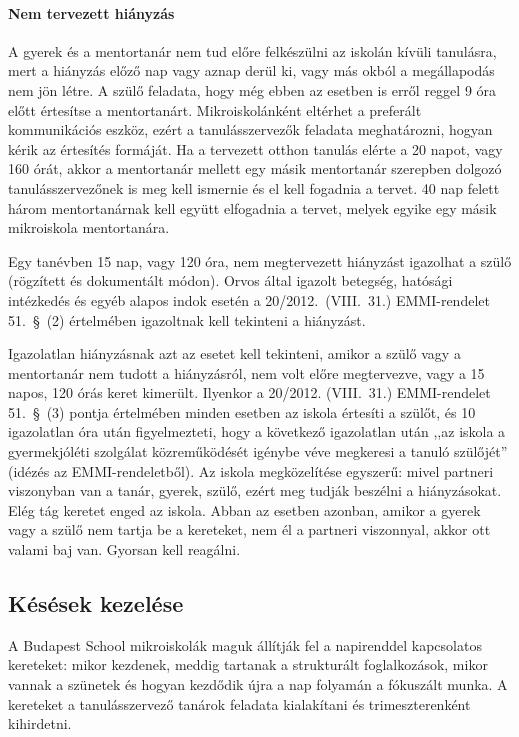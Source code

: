 \paragraph{Nem tervezett hiányzás} A gyerek és a mentortanár nem tud előre felkészülni az iskolán kívüli tanulásra, mert a hiányzás előző nap vagy aznap derül ki, vagy más okból a megállapodás nem jön létre. A szülő feladata, hogy még ebben az esetben is erről reggel 9 óra előtt értesítse a mentortanárt. Mikroiskolánként eltérhet a preferált kommunikációs eszköz, ezért a tanulásszervezők feladata meghatározni, hogyan kérik az értesítés formáját.
Ha a tervezett otthon tanulás elérte a 20 napot, vagy 160 órát, akkor a mentortanár mellett egy másik mentortanár szerepben dolgozó tanulásszervezőnek is meg kell ismernie és el kell fogadnia a tervet. 40 nap felett három mentortanárnak kell együtt elfogadnia a tervet, melyek egyike egy másik mikroiskola mentortanára.

Egy tanévben 15 nap, vagy 120 óra, nem megtervezett hiányzást igazolhat a szülő (rögzített és dokumentált módon). Orvos által igazolt betegség, hatósági intézkedés és egyéb alapos indok esetén a 20/2012.~(VIII.~31.) EMMI-rendelet 51.~§~(2) értelmében igazoltnak kell tekinteni a hiányzást.

Igazolatlan hiányzásnak azt az esetet kell tekinteni, amikor a szülő vagy a mentortanár nem tudott a hiányzásról, nem volt előre megtervezve, vagy a 15 napos, 120 órás keret kimerült. Ilyenkor a 20/2012. (VIII.~31.) EMMI-rendelet 51.~§~(3) pontja értelmében minden esetben az iskola értesíti a szülőt, és 10 igazolatlan óra után figyelmezteti, hogy a következő igazolatlan után ,,az iskola a gyermekjóléti szolgálat közreműködését igénybe véve megkeresi a tanuló szülőjét'' (idézés az EMMI-rendeletből). Az iskola megközelítése egyszerű: mivel partneri viszonyban van a tanár, gyerek, szülő, ezért meg tudják beszélni a hiányzásokat. Elég tág keretet enged az iskola. Abban az esetben azonban, amikor a gyerek vagy a szülő nem tartja be a kereteket, nem él a partneri viszonnyal, akkor ott valami baj van. Gyorsan kell reagálni.

\subsection{Késések kezelése}
A Budapest School mikroiskolák maguk állítják fel a napirenddel kapcsolatos kereteket: mikor kezdenek, meddig tartanak a strukturált foglalkozások, mikor vannak a szünetek és hogyan kezdődik újra a nap folyamán a fóku\-szált munka. A kereteket a tanulásszervező tanárok feladata kialakítani és trimeszterenként kihirdetni.

